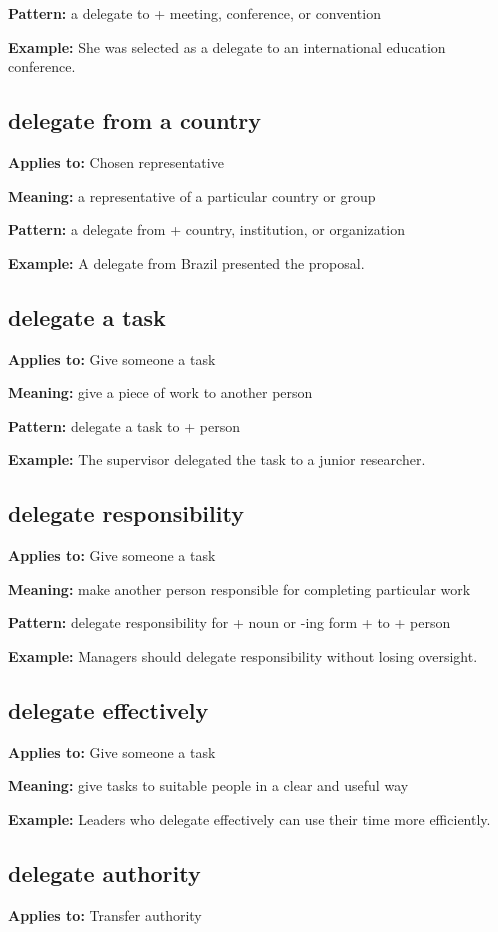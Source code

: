\documentclass[11pt]{article}
\begin{document}
\textbf{Pattern:} a delegate to + meeting, conference, or convention

\textbf{Example:} She was selected as a delegate to an international education conference.

\subsection{delegate from a country}
\textbf{Applies to:} Chosen representative

\textbf{Meaning:} a representative of a particular country or group

\textbf{Pattern:} a delegate from + country, institution, or organization

\textbf{Example:} A delegate from Brazil presented the proposal.

\subsection{delegate a task}
\textbf{Applies to:} Give someone a task

\textbf{Meaning:} give a piece of work to another person

\textbf{Pattern:} delegate a task to + person

\textbf{Example:} The supervisor delegated the task to a junior researcher.

\subsection{delegate responsibility}
\textbf{Applies to:} Give someone a task

\textbf{Meaning:} make another person responsible for completing particular work

\textbf{Pattern:} delegate responsibility for + noun or -ing form + to + person

\textbf{Example:} Managers should delegate responsibility without losing oversight.

\subsection{delegate effectively}
\textbf{Applies to:} Give someone a task

\textbf{Meaning:} give tasks to suitable people in a clear and useful way

\textbf{Example:} Leaders who delegate effectively can use their time more efficiently.

\subsection{delegate authority}
\textbf{Applies to:} Transfer authority
\end{document}

